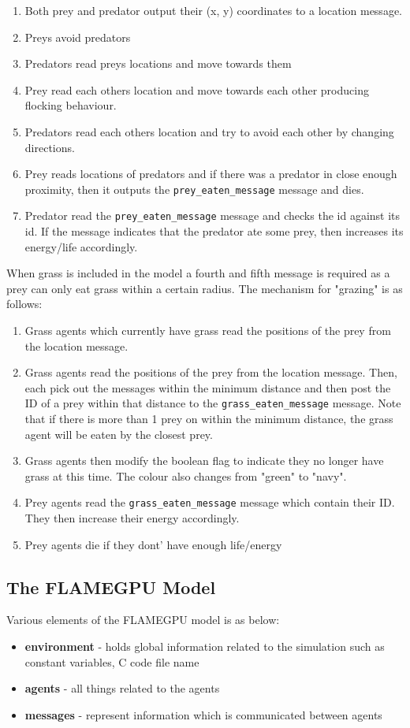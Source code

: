 \begin{enumerate}
\item Both prey and predator output their (x, y) coordinates to a location message.
\item Preys avoid predators
\item Predators read preys locations and move towards them
\item Prey read each others location and move towards each other producing flocking behaviour.
\item Predators read each others location and try to avoid each other by changing directions.
\item Prey reads locations of predators and if there was a predator in close enough proximity, then it outputs the \verb|prey_eaten_message| message and dies.
\item Predator read the \verb|prey_eaten_message| message and checks the id against its id. If the message indicates that the predator ate some prey, then increases its energy/life accordingly.
\end{enumerate}

When grass is included in the model a fourth and fifth message is required as a prey can only eat grass within a certain radius. The mechanism for "grazing" is as follows:

\begin{enumerate}
\item  Grass agents which currently have grass read the positions of the prey from the location
message.
\item  Grass agents read the positions of the prey from the location message. Then, each pick out the messages within the minimum distance and then post the ID of a prey within that distance to the \verb|grass_eaten_message| message. Note that if there is more than 1 prey on within the minimum distance, the grass agent will be eaten by the closest prey.
\item  Grass agents then modify the boolean flag to indicate they no longer have grass at this
time. The colour also changes from "green" to "navy".
\item  Prey agents read the \verb|grass_eaten_message| message which contain their ID. They then increase their energy accordingly.
\item Prey agents die if they dont' have enough life/energy
\end{enumerate}

\subsection{The FLAMEGPU Model}
Various elements of the FLAMEGPU model is as below:
\begin{itemize}
    \item \textbf{environment} - holds global information related to the simulation such as constant variables, C code file name
\item \textbf{agents} - all things related to the agents
\item \textbf{messages} - represent information which is communicated between agents
\end{itemize}

